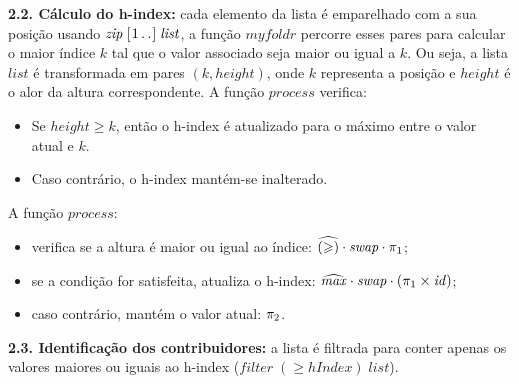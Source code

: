 \documentclass[11pt, a4paper, fleqn]{article}
\newcommand{\Varid}[1]{\mathit{#1}}
\renewcommand{\geq}{\geqslant}
\begin{document}
\textbf{2.2. Cálculo do h-index:} cada elemento da lista é emparelhado com a sua posição usando \ensuremath{\Varid{zip}\;[\mskip1.5mu \mathrm{1}\mathinner{\ldotp\ldotp}\mskip1.5mu]\;\Varid{list}}, a função \ensuremath{\Varid{myfoldr}} percorre esses pares para calcular o maior índice \ensuremath{\Varid{k}} tal que o valor associado seja maior ou igual a \ensuremath{\Varid{k}}.
Ou seja, a lista \ensuremath{\Varid{list}} é transformada em pares \ensuremath{(\Varid{k},\Varid{height})}, onde \ensuremath{\Varid{k}} representa a posição e \ensuremath{\Varid{height}} é o alor da altura correspondente. A função \ensuremath{\Varid{process}} verifica:
\begin{itemize}
    \item Se \ensuremath{\Varid{height}\geq \Varid{k}}, então o h-index é atualizado para o máximo entre o valor atual e \ensuremath{\Varid{k}}.
    \item Caso contrário, o h-index mantém-se inalterado.
\end{itemize}
A função \ensuremath{\Varid{process}}:
\begin{itemize}
    \item verifica se a altura é maior ou igual ao índice: \ensuremath{\uncurry{(\geq )}\comp \Varid{swap}\comp \p1};
    \item se a condição for satisfeita, atualiza o h-index: \ensuremath{\uncurry{\Varid{max}}\comp \Varid{swap}\comp (\p1\times\Varid{id})};
    \item caso contrário, mantém o valor atual: \ensuremath{\p2}.
\end{itemize}

\textbf{2.3. Identificação dos contribuidores:} a lista é filtrada para conter apenas os valores maiores ou iguais ao h-index (\ensuremath{\Varid{filter}\;(\geq \Varid{hIndex})\;\Varid{list}}).
\end{document}
